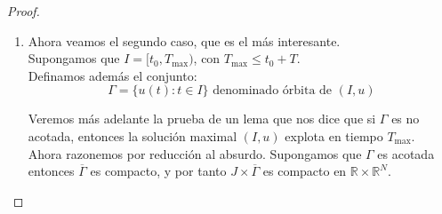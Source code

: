 \begin{proof}
\begin{enumerate}
        Si se quisiera extender la solución maximal a su derecha, se podría hacer definiendo la función:
        \[
            \widetilde{u}(t) =
            \begin{cases}
                u(t), & t \in [t_0, T_{\text{max}}] \\
                w(t), & t \in [T_{\text{max}}, T_{\text{max}} + \delta]
            \end{cases}
        \]
        Donde $w(t)$ es la solución del PVI:
        \[
            \begin{cases}
                w'(t) = f(t, w(t)) \\
                w(T_{\text{max}}) = u(T_{\text{max}})
            \end{cases}
        \]
        Y por el Teorema de unicidad global, $w(t)$ es la única solución de este PVI en el intervalo $[T_{\text{max}}, T_{\text{max}} + \delta]$, y además $\widetilde{u}(t)$ es continua y derivable en todo el intervalo $[t_0, T_{\text{max}} + \delta]$, por lo que $\widetilde{u}(t)$ es una prolongación estricta de la solución maximal $(I, u)$ a su derecha, lo cual es una contradicción.\\

        \item Ahora veamos el segundo caso, que es el más interesante.\\
        Supongamos que $I = [t_0, T_{\text{max}})$, con $T_{\text{max}} \leq t_0 + T$.\\

        Definamos además el conjunto:
        \[
            \Gamma = \{ u(t) : t \in I \} \text{ denominado órbita de } (I, u)
        \]
        
        Veremos más adelante la prueba de un lema que nos dice que si $\Gamma$ es no acotada, entonces la solución maximal $(I, u)$ explota en tiempo $T_{\text{max}}$.\\

        Ahora razonemos por reducción al absurdo. Supongamos que $\Gamma$ es acotada entonces $\overline{\Gamma}$ es compacto, y por tanto $J \times \overline{\Gamma}$ es compacto en $\mathbb{R} \times \mathbb{R}^N$.\\


\end{enumerate}
\end{proof}
